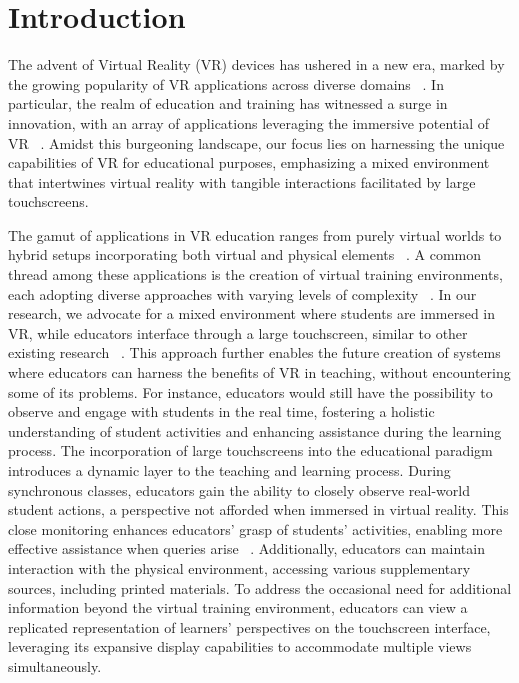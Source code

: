 \section{Introduction}
The advent of Virtual Reality (VR) devices has ushered in a new era, marked by the growing popularity of VR applications across diverse domains ~\cite{vrPopularity}. In particular, the realm of education and training has witnessed a surge in innovation, with an array of applications leveraging the immersive potential of VR ~\cite{reviewVRTrainings, vrELearning}. Amidst this burgeoning landscape, our focus lies on harnessing the unique capabilities of VR for educational purposes, emphasizing a mixed environment that intertwines virtual reality with tangible interactions facilitated by large touchscreens.

The gamut of applications in VR education ranges from purely virtual worlds to hybrid setups incorporating both virtual and physical elements ~\cite{arClimbing, arAmbulance, laparoscopyInstrumentVR, weaponTrainingVR}. A common thread among these applications is the creation of virtual training environments, each adopting diverse approaches with varying levels of complexity ~\cite{vrTrainingRecording, coAssemble}. In our research, we advocate for a mixed environment where students are immersed in VR, while educators interface through a large touchscreen, similar to other existing research ~\cite{largeDisplays1, largeDisplays2}. This approach further enables the future creation of systems where educators can harness the benefits of VR in teaching, without encountering some of its problems. For instance, educators would still have the possibility to observe and engage with students in the real time, fostering a holistic understanding of student activities and enhancing assistance during the learning process.
%
The incorporation of large touchscreens into the educational paradigm introduces a dynamic layer to the teaching and learning process. During synchronous classes, educators gain the ability to closely observe real-world student actions, a perspective not afforded when immersed in virtual reality. This close monitoring enhances educators' grasp of students' activities, enabling more effective assistance when queries arise ~\cite{gesturalInterfaces}. Additionally, educators can maintain interaction with the physical environment, accessing various supplementary sources, including printed materials. To address the occasional need for additional information beyond the virtual training environment, educators can view a replicated representation of learners' perspectives on the touchscreen interface, leveraging its expansive display capabilities to accommodate multiple views simultaneously.

